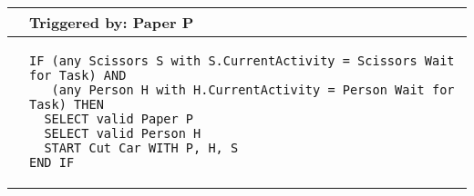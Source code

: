 \begin{longtable}{@{}>{\raggedright\arraybackslash}p{0.25cm}>{\raggedright\arraybackslash}p{13cm}@{}}
  \toprule
   & Triggered by: Paper P\\ \midrule 
  &
\begin{lstlisting}[language=CMPseudo]
IF (any Scissors S with S.CurrentActivity = Scissors Wait for Task) AND
   (any Person H with H.CurrentActivity = Person Wait for Task) THEN
  SELECT valid Paper P
  SELECT valid Person H
  START Cut Car WITH P, H, S
END IF
\end{lstlisting}
  \\ \bottomrule
  \end{longtable}